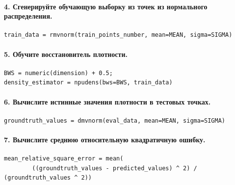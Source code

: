 \documentclass[12pt]{article}
\begin{document}
\paragraph{4. Сгенерируйте обучающую выборку из точек из нормального распределения.}
\begin{verbatim}
train_data = rmvnorm(train_points_number, mean=MEAN, sigma=SIGMA)
\end{verbatim}

\paragraph{5. Обучите восстановитель плотности.}
\begin{verbatim}
BWS = numeric(dimension) + 0.5;
density_estimator = npudens(bws=BWS, train_data)
\end{verbatim}

\paragraph{6. Вычислите истинные значения плотности в тестовых точках.}
\begin{verbatim}
groundtruth_values = dmvnorm(eval_data, mean=MEAN, sigma=SIGMA)
\end{verbatim}

\paragraph{7. Вычислите среднюю относительную квадратичную ошибку.}
\begin{verbatim}
mean_relative_square_error = mean(
        ((groundtruth_values - predicted_values) ^ 2) / (groundtruth_values ^ 2))
\end{verbatim}
\end{document}
